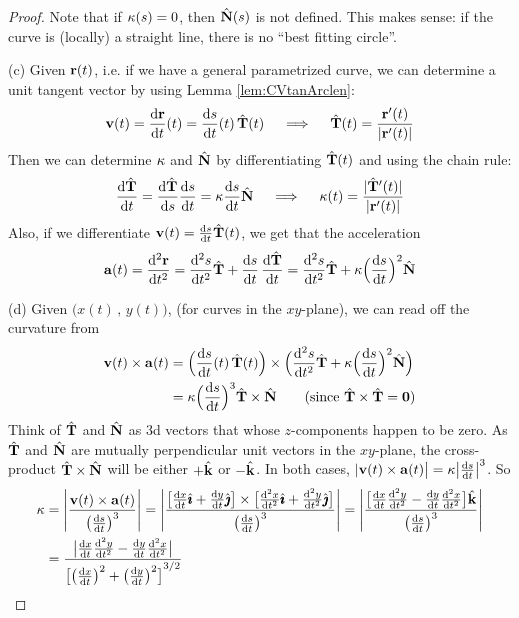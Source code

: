 \begin{proof}
{}

\noindent
Note that if $\kappa(s)=0$, then $\hat{\mathbf{N}}(s)$ is not defined. This makes sense:
if the curve is (locally) a straight line, there is no ``best fitting circle''.

\bigskip
\noindent (c)
Given $\mathbf{r}(t)$,
i.e. if we have a general parametrized curve, we can determine a unit
tangent vector by using Lemma \ref{lem:CVtanArclen}:
\begin{equation*}
\vv(t) = \diff{\vr}{t}(t) = \diff{s}{t}(t)\,\hat\vT(t)
\quad\implies\quad
\hat\vT(t) = \frac{\vr'(t)}{|\vr'(t)|}
\end{equation*}
Then we can determine $\kappa$ and $\hat{\mathbf{N}}$  by differentiating
$\hat{\mathbf{T}}(t)$ and using the chain rule:
\begin{equation*}
\diff{\hat\vT}{t} = \diff{\hat\vT}{s}\diff{s}{t}
 = \ka \diff{s}{t} \hat\vN
\quad\implies\quad
\ka(t) = \frac{|\hat\vT'(t)|}{|\vr'(t)|}
\end{equation*}
Also, if we differentiate $\vv(t) = \diff{s}{t}\hat\vT(t)$, we get
that the acceleration
\begin{equation*}
\va(t) = \difftwo{\vr}{t} 
       =  \difftwo{s}{t}\hat\vT + \diff{s}{t}\,\diff{\hat\vT}{t}
       =  \difftwo{s}{t}\hat\vT
                           + \ka\Big(\diff{s}{t}\Big)^2\hat\vN
\end{equation*}

\bigskip
\noindent (d)\label{clpcurvesthm:curvatureFormulae:partd}
Given $\big(x(t)\,,\,y(t)\big)$, (for curves in the $xy$-plane),
we can read off the curvature from
\begin{align*}
\vv(t)\times\va(t) 
&=\Big(\diff{s}{t}(t)\,\hat\vT(t)\Big)\times
    \Big(\difftwo{s}{t}\hat\vT
                           + \ka\Big(\diff{s}{t}\Big)^2\hat\vN\Big) 
\\
&= \ka\Big(\diff{s}{t}\Big)^3\hat\vT\times\hat\vN
\qquad\text{(since $\hat\vT\times\hat\vT=\vZero$)}
\end{align*} 
Think of $\hat{\mathbf{T}}$ and $\hat{\mathbf{N}}$ as 3d vectors that whose $z$-components happen to be zero. As $\hat{\mathbf{T}}$ and $\hat{\mathbf{N}}$ are mutually perpendicular 
unit vectors in the $xy$-plane, the cross-product $\hat{\mathbf{T}}\times\hat{\mathbf{N}}$
will be either $+\hat{\mathbf{k}}$ or $-\hat{\mathbf{k}}$. In both cases, 
$|\vv(t)\times\va(t)\big| = \ka\big|\diff{s}{t}\big|^3$. So
\begin{align*}
\ka &= \left|\frac{\vv(t)\times\va(t)}{\big(\diff{s}{t}\big)^3}\right|
=\left|\frac{\big[\diff{x}{t}\hi+\diff{y}{t}\hj\big]\times
        \big[\difftwo{x}{t}\hi+\difftwo{y}{t}\hj\big]}
           {\big(\diff{s}{t}\big)^3}\right|
=\left|\frac{\big[\diff{x}{t}\difftwo{y}{t}-\diff{y}{t}\difftwo{x}{t}\big]\hk}
           {\big(\diff{s}{t}\big)^3}\right|
\\
&=\frac{\big|\diff{x}{t}\difftwo{y}{t}-\diff{y}{t}\difftwo{x}{t}\big|}
{ {\big[\big(\diff{x}{t}\big)^2+\big(\diff{y}{t}\big)^2\big]}^{3/2} }
\end{align*}


\end{proof}
